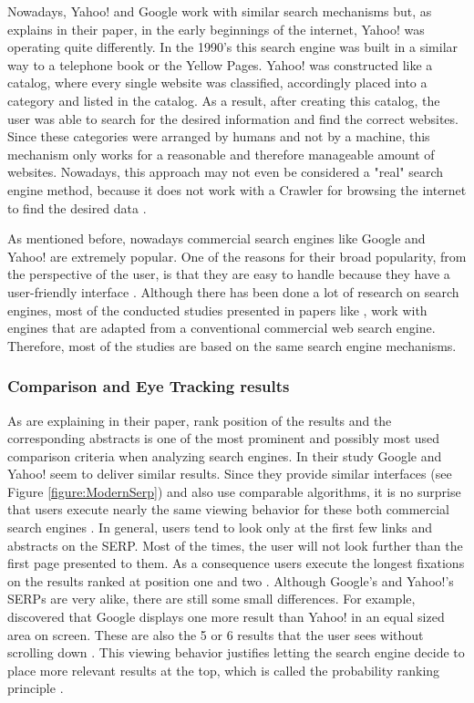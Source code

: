 Nowadays, Yahoo! and Google work with similar search mechanisms but, as \textcite{weber2011search} explains in their paper, in the early beginnings of the internet, Yahoo! was operating quite differently. 
In the 1990's this search engine was built in a similar way to a telephone book or the Yellow Pages. Yahoo! was constructed like a catalog, where every single website was classified, accordingly placed into a category and listed in the catalog. As a result, after creating this catalog, the user was able to search for the desired information and find the correct websites. Since these categories were arranged by humans and not by a machine, this mechanism only works for a reasonable and therefore manageable amount of websites. Nowadays, this approach may not even be considered a "real" search engine method, because it does not work with a Crawler for browsing the internet to find the desired data \autocite{weber2011search}.

As mentioned before, nowadays commercial search engines like Google and Yahoo! are extremely popular. One of the reasons for their broad popularity, from the perspective of the user, is that they are easy to handle because they have a user-friendly interface \autocite{pan2007google}. 
Although there has been done a lot of research on search engines, most of the conducted studies presented in papers like \textcite{liu2015influence, buscher2010good}, work with engines that are adapted from a conventional commercial web search engine. Therefore, most of the studies are based on the same search engine mechanisms.

\subsubsection{Comparison and Eye Tracking results}
As \textcite{pan2007google, wang2016beyond} are explaining in their paper, rank position of the results and the corresponding abstracts is one of the most prominent and possibly most used comparison criteria when analyzing search engines. 
In their study \textcite{lorigo2008eye} Google and Yahoo! seem to deliver similar results. Since they provide similar interfaces (see Figure \ref{figure:ModernSerp}) and also use comparable algorithms, it is no surprise that users execute nearly the same viewing behavior for these both commercial search engines \autocite{lorigo2008eye}. 
In general, users tend to look only at the first few links and abstracts on the SERP. Most of the times, the user will not look further than the first page presented to them. As a consequence users execute the longest fixations on the results ranked at position one and two \autocite{granka2004eye, lorigo2008eye}. Although Google's and Yahoo!'s SERPs are very alike, there are still some small differences. For example, \textcite{lorigo2008eye} discovered that Google displays one more result than Yahoo! in an equal sized area on screen. These are also the 5 or 6 results that the user sees without scrolling down \autocite{lorigo2008eye}. 
This viewing behavior justifies letting the search engine decide to place more relevant results at the top, which is called the probability ranking principle \autocite{wang2016beyond}.

